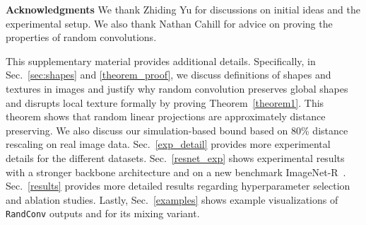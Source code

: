 \documentclass{article} \usepackage{iclr2021_conference,times}
\newcommand{\RandConv}{\texttt{RandConv}}
\begin{document}
\textbf{Acknowledgments} We thank Zhiding Yu for discussions on initial ideas and the experimental setup. We also thank Nathan Cahill for advice on proving the properties of random convolutions.
\newpage










\newpage
\appendix
This supplementary material provides additional details. Specifically, in Sec.~\ref{sec:shapes} and \ref{theorem_proof}, we discuss definitions of shapes and textures in images and justify why random convolution preserves global shapes and disrupts local texture formally by proving Theorem~\ref{theorem1}. This theorem shows that random linear projections are approximately distance preserving. We also discuss our simulation-based bound based on 80\% distance rescaling on real image data. Sec.~\ref{exp_detail} provides more experimental details for the different datasets. Sec.~\ref{resnet_exp} shows experimental results with a stronger backbone architecture and on a new benchmark ImageNet-R~\citep{hendrycks2020many}.  Sec.~\ref{results} provides more detailed results regarding hyperparameter selection and ablation studies. Lastly, Sec.~\ref{examples} shows example visualizations of {\RandConv} outputs and for its mixing variant.
\end{document}
